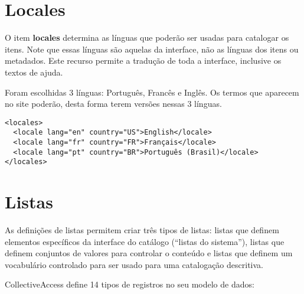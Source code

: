 
\lstset{language=XML}
\section{Locales}

O item \textbf{locales} determina as línguas que poderão ser usadas para catalogar os itens. Note que essas línguas são aquelas da interface, não as línguas dos itens ou metadados. Este recurso permite a tradução de toda a interface, inclusive os textos de ajuda.

Foram escolhidas 3 línguas: Português, Francês e Inglês. Os termos que aparecem no site poderão, desta forma terem versões nessas 3 línguas.

\begin{lstlisting}
<locales>
  <locale lang="en" country="US">English</locale>
  <locale lang="fr" country="FR">Français</locale>
  <locale lang="pt" country="BR">Português (Brasil)</locale>
</locales>
\end{lstlisting}

\section{Listas}

As definições de listas permitem criar três tipos de listas: listas que definem elementos específicos da interface do catálogo (``listas do sistema''), listas que definem conjuntos de valores para controlar o conteúdo e listas que definem um vocabulário controlado para ser usado para uma catalogação descritiva. 


CollectiveAccess define 14 tipos de registros no seu modelo de dados:

